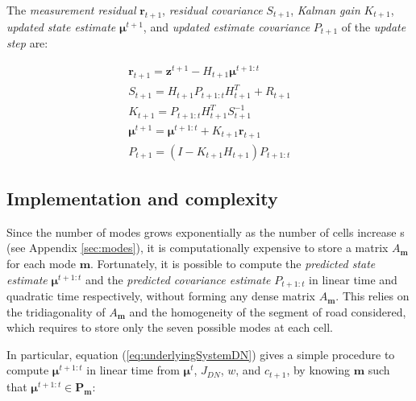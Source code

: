 \noindent The \emph{measurement residual} $\boldsymbol r_{t+1}$, \emph{residual covariance} $S_{t+1}$, \emph{Kalman gain} $K_{t+1}$, \emph{updated state estimate} $\boldsymbol\mu^{t+1}$, and \emph{updated estimate covariance} $P_{t+1}$ of the \emph{update step} are:

\begin{equation}
\begin{array}{l}
\boldsymbol r_{t+1} = \boldsymbol z^{t+1} - H_{t+1}\boldsymbol\mu^{t+1:t}\\
S_{t+1} = H_{t+1}P_{t+1:t}H_{t+1}^{T}+R_{t+1}\\
K_{t+1} = P_{t+1:t}H_{t+1}^{T}S_{t+1}^{-1}\\
\boldsymbol\mu^{t+1} = \boldsymbol\mu^{t+1:t} + K_{t+1} \boldsymbol r_{t+1}\\
P_{t+1} = (I - K_{t+1}H_{t+1})P_{t+1:t}
\end{array}
\label{eq:update}
\end{equation}

\subsection{Implementation and complexity}\label{sec:implementation}

Since the number of modes grows exponentially as the number of cells increase
s (see Appendix \ref{sec:modes}), it is computationally expensive to store a matrix $A_{\boldsymbol m}$ for each mode $\boldsymbol m$. Fortunately, it is possible to compute the \textit{predicted state estimate} $\boldsymbol\mu^{t+1:t}$ and the \textit{predicted covariance estimate} $P_{t+1:t}$ in linear time and quadratic time respectively, without forming any dense matrix $A_{\boldsymbol m}$. This relies on the tridiagonality of $A_{\boldsymbol m}$ and the homogeneity of the segment of road considered, which requires to store only the seven possible modes at each cell\footnotemark.


In particular, equation (\ref{eq:underlyingSystemDN}) gives a simple procedure to compute $\boldsymbol\mu^{t+1:t}$ in linear time from $\boldsymbol\mu^{t}$, $J_{DN}$, $w$, and $c_{t+1}$, by knowing $\boldsymbol m$ such that $\boldsymbol\mu^{t+1:t}\in\textbf{P}_{\boldsymbol m}$:

